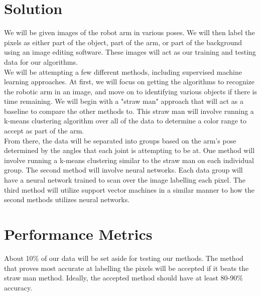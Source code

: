 \documentclass{article}
\begin{document}
\section{Solution}

We will be given images of the robot arm in various poses.
We will then label the pixels as either part of the object, part of the arm, or part of the background using an image editing software.
These images will act as our training and testing data for our algorithms.\\


\noindent
We will be attempting a few different methods, including supervised machine learning approaches.
At first, we will focus on getting the algorithms to recognize the robotic arm in an image, and move on to identifying various objects if there is time remaining.
We will begin with a "straw man" approach that will act as a baseline to compare the other methods to.
This straw man will involve running a k-means clustering algorithm over all of the data to determine a color range to accept as part of the arm. \\


\noindent
From there, the data will be separated into groups based on the arm's pose determined by the angles that each joint is attempting to be at.
One method will involve running a k-means clustering similar to the straw man on each individual group.
The second method will involve neural networks.
Each data group will have a neural network trained to scan over the image labelling each pixel.
The third method will utilize support vector machines in a similar manner to how the second methods utilizes neural networks.



\section{Performance Metrics}
About 10\% of our data will be set aside for testing our methods. 
The method that proves most accurate at labelling the pixels will be accepted if it beats the straw man method.
Ideally, the accepted method should have at least 80-90\% accuracy.
\end{document}
